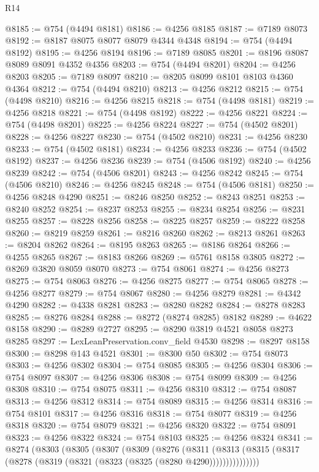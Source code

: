 \begin{lexlean}{R14}
\begin{coremodule}
@8185 := @754 (@4494 @8181)
@8186 := @4256 @8185
@8187 := @7189 @8073
@8192 := @8187 @8075 @8077 @8079 @4344 @4348
@8194 := @754 (@4494 @8192)
@8195 := @4256 @8194
@8196 := @7189 @8085
@8201 := @8196 @8087 @8089 @8091 @4352 @4356
@8203 := @754 (@4494 @8201)
@8204 := @4256 @8203
@8205 := @7189 @8097
@8210 := @8205 @8099 @8101 @8103 @4360 @4364
@8212 := @754 (@4494 @8210)
@8213 := @4256 @8212
@8215 := @754 (@4498 @8210)
@8216 := @4256 @8215
@8218 := @754 (@4498 @8181)
@8219 := @4256 @8218
@8221 := @754 (@4498 @8192)
@8222 := @4256 @8221
@8224 := @754 (@4498 @8201)
@8225 := @4256 @8224
@8227 := @754 (@4502 @8201)
@8228 := @4256 @8227
@8230 := @754 (@4502 @8210)
@8231 := @4256 @8230
@8233 := @754 (@4502 @8181)
@8234 := @4256 @8233
@8236 := @754 (@4502 @8192)
@8237 := @4256 @8236
@8239 := @754 (@4506 @8192)
@8240 := @4256 @8239
@8242 := @754 (@4506 @8201)
@8243 := @4256 @8242
@8245 := @754 (@4506 @8210)
@8246 := @4256 @8245
@8248 := @754 (@4506 @8181)
@8250 := @4256 @8248 @4290
@8251 := @8246 @8250
@8252 := @8243 @8251
@8253 := @8240 @8252
@8254 := @8237 @8253
@8255 := @8234 @8254
@8256 := @8231 @8255
@8257 := @8228 @8256
@8258 := @8225 @8257
@8259 := @8222 @8258
@8260 := @8219 @8259
@8261 := @8216 @8260
@8262 := @8213 @8261
@8263 := @8204 @8262
@8264 := @8195 @8263
@8265 := @8186 @8264
@8266 := @4255 @8265
@8267 := @8183 @8266
@8269 := @5761 @8158 @3805
@8272 := @8269 @3820 @8059 @8070
@8273 := @754 @8061
@8274 := @4256 @8273
@8275 := @754 @8063
@8276 := @4256 @8275
@8277 := @754 @8065
@8278 := @4256 @8277
@8279 := @754 @8067
@8280 := @4256 @8279
@8281 := @4342 @4290
@8282 := @4338 @8281
@8283 := @8280 @8282
@8284 := @8278 @8283
@8285 := @8276 @8284
@8288 := @8272 (@8274 @8285) @8182
@8289 := @4622 @8158
@8290 := @8289 @2727
@8295 := @8290 @3819 @4521 @8058 @8273 @8285
@8297 := LexLeanPreservation.conv_field @4530
@8298 := @8297 @8158
@8300 := @8298 @143 @4521
@8301 := @8300 @50
@8302 := @754 @8073
@8303 := @4256 @8302
@8304 := @754 @8085
@8305 := @4256 @8304
@8306 := @754 @8097
@8307 := @4256 @8306
@8308 := @754 @8099
@8309 := @4256 @8308
@8310 := @754 @8075
@8311 := @4256 @8310
@8312 := @754 @8087
@8313 := @4256 @8312
@8314 := @754 @8089
@8315 := @4256 @8314
@8316 := @754 @8101
@8317 := @4256 @8316
@8318 := @754 @8077
@8319 := @4256 @8318
@8320 := @754 @8079
@8321 := @4256 @8320
@8322 := @754 @8091
@8323 := @4256 @8322
@8324 := @754 @8103
@8325 := @4256 @8324
@8341 := @8274
    (@8303
      (@8305
        (@8307
          (@8309
            (@8276
              (@8311
                (@8313 (@8315 (@8317 (@8278 (@8319 (@8321 (@8323 (@8325 (@8280 @4290)))))))))))))))

\end{coremodule}
\end{lexlean}
